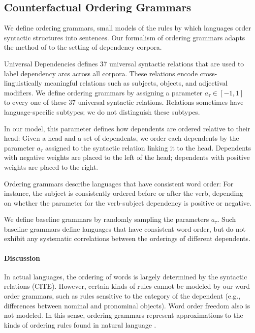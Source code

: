 \documentclass[11pt,letterpaper]{article}
\begin{document}
\subsection{Counterfactual Ordering Grammars}
We define ordering grammars, small models of the rules by which languages order syntactic structures into sentences.
Our formalism of ordering grammars adapts the method of \cite{gildea-optimizing-2007, gildea-grammars-2010, gildea-human-2015} to the setting of dependency corpora.

Universal Dependencies defines 37 universal syntactic relations that are used to label dependency arcs across all corpora.
These relations encode cross-linguistically meaningful relations such as subjects, objects, and adjectival modifiers.
We define ordering grammars by assigning a parameter $a_\tau \in [-1,1]$ to every one of these 37 universal syntactic relations.
Relations sometimes have language-specific subtypes; we do not distinguish these subtypes.

In our model, this parameter defines how dependents are ordered relative to their head:
Given a head and a set of dependents, we order each dependents by the parameter $a_\tau$ assigned to the syntactic relation linking it to the head.
Dependents with negative weights are placed to the left of the head; dependents with positive weights are placed to the right.

Ordering grammars describe languages that have consistent word order:
For instance, the subject is consistently ordered before or after the verb, depending on whether the parameter for the verb-subject dependency is positive or negative.

We define baseline grammars by randomly sampling the parameters $a_\tau$.
Such baseline grammars define languages that have consistent word order, but do not exhibit any systematic correlations between the orderings of different dependents.



\paragraph{Discussion}
In actual languages, the ordering of words is largely determined by the syntactic relations (CITE).
However, certain kinds of rules cannot be modeled by our word order grammars, such as rules sensitive to the category of the dependent (e.g., differences between nominal and pronominal objects).
Word order freedom also is not modeled.
In this sense, ordering grammars represent approximations to the kinds of ordering rules found in natural language \cite{gildea-optimizing-2007, gildea-grammars-2010, gildea-human-2015}.
\end{document}
